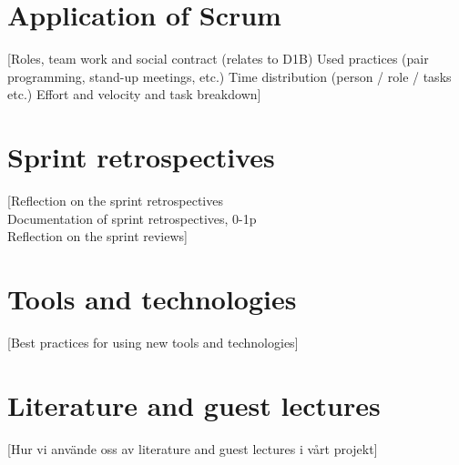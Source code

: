 \documentclass[a4paper,11pt]{article}
\begin{document}
\section{Application of Scrum}
[Roles, team work and social contract (relates to D1B)
Used practices (pair programming, stand-up meetings, etc.)
Time distribution (person / role / tasks etc.)
Effort and velocity and task breakdown]
\section{Sprint retrospectives}
[Reflection on the sprint retrospectives \\
Documentation of sprint retrospectives, 0-1p\\
Reflection on the sprint reviews]
\section{Tools and technologies}
[Best practices for using new tools and technologies]
\section{Literature and guest lectures}
[Hur vi använde oss av literature and guest lectures i vårt projekt]

\setcounter{page}{1}
\end{document}
